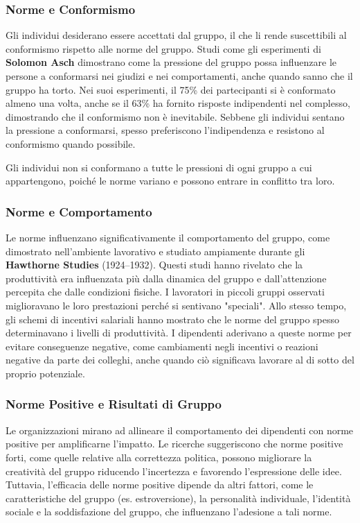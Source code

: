 \documentclass{article}
\begin{document}
\subsubsection{Norme e Conformismo}

Gli individui desiderano essere accettati dal gruppo, il che li rende suscettibili al conformismo rispetto alle norme del gruppo. Studi come gli esperimenti di \textbf{Solomon Asch} dimostrano come la pressione del gruppo possa influenzare le persone a conformarsi nei giudizi e nei comportamenti, anche quando sanno che il gruppo ha torto. Nei suoi esperimenti, il 75\% dei partecipanti si è conformato almeno una volta, anche se il 63\% ha fornito risposte indipendenti nel complesso, dimostrando che il conformismo non è inevitabile. Sebbene gli individui sentano la pressione a conformarsi, spesso preferiscono l'indipendenza e resistono al conformismo quando possibile.

Gli individui non si conformano a tutte le pressioni di ogni gruppo a cui appartengono, poiché le norme variano e possono entrare in conflitto tra loro.

\subsubsection{Norme e Comportamento}

Le norme influenzano significativamente il comportamento del gruppo, come dimostrato nell'ambiente lavorativo e studiato ampiamente durante gli \textbf{Hawthorne Studies} (1924–1932). Questi studi hanno rivelato che la produttività era influenzata più dalla dinamica del gruppo e dall'attenzione percepita che dalle condizioni fisiche. I lavoratori in piccoli gruppi osservati miglioravano le loro prestazioni perché si sentivano "speciali". Allo stesso tempo, gli schemi di incentivi salariali hanno mostrato che le norme del gruppo spesso determinavano i livelli di produttività. I dipendenti aderivano a queste norme per evitare conseguenze negative, come cambiamenti negli incentivi o reazioni negative da parte dei colleghi, anche quando ciò significava lavorare al di sotto del proprio potenziale.

\subsubsection{Norme Positive e Risultati di Gruppo}

Le organizzazioni mirano ad allineare il comportamento dei dipendenti con norme positive per amplificarne l'impatto. Le ricerche suggeriscono che norme positive forti, come quelle relative alla correttezza politica, possono migliorare la creatività del gruppo riducendo l'incertezza e favorendo l'espressione delle idee. Tuttavia, l'efficacia delle norme positive dipende da altri fattori, come le caratteristiche del gruppo (es. estroversione), la personalità individuale, l'identità sociale e la soddisfazione del gruppo, che influenzano l'adesione a tali norme.
\end{document}
